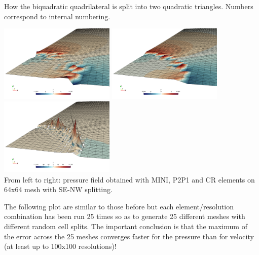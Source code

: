 \begin{center}

{\captionfont How the biquadratic quadrilateral is split into two quadratic triangles. 
Numbers correspond to internal numbering.}
\end{center}

\vspace{1cm}

\begin{center}
\includegraphics[width=5.5cm]{python_codes/fieldstone_112/results/exp5_tridiag/64x64_tridiag1/MINI}
\includegraphics[width=5.5cm]{python_codes/fieldstone_112/results/exp5_tridiag/64x64_tridiag1/P2P1}
\includegraphics[width=5.5cm]{python_codes/fieldstone_112/results/exp5_tridiag/64x64_tridiag1/CR}\\
{\captionfont From left to right: pressure field obtained with MINI, P2P1 and CR elements on 64x64 mesh
with SE-NW splitting.}
\end{center}



\newpage
The following plot are similar to those before but each element/resolution combination has been run 
25 times so as to generate 25 different meshes with different random cell splits. The important conclusion
is that the maximum of the error across the 25 meshes converges faster for the pressure than for velocity
(at least up to 100x100 resolutions)!


